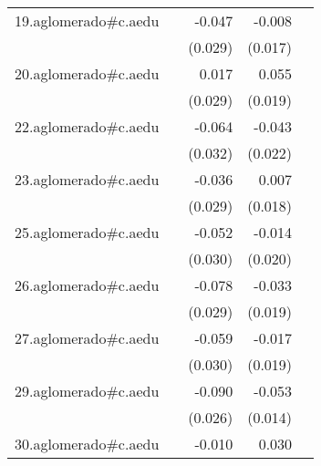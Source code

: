 {\begin{longtable}{l*{4}{D{.}{.}{-1}}}
\addlinespace
19.aglomerado#c.aedu&                     &      -0.047         &      -0.008         &                     \\
            &                     &     (0.029)         &     (0.017)         &                     \\
\addlinespace
20.aglomerado#c.aedu&                     &       0.017         &       0.055\sym{**} &                     \\
            &                     &     (0.029)         &     (0.019)         &                     \\
\addlinespace
22.aglomerado#c.aedu&                     &      -0.064\sym{*}  &      -0.043\sym{*}  &                     \\
            &                     &     (0.032)         &     (0.022)         &                     \\
\addlinespace
23.aglomerado#c.aedu&                     &      -0.036         &       0.007         &                     \\
            &                     &     (0.029)         &     (0.018)         &                     \\
\addlinespace
25.aglomerado#c.aedu&                     &      -0.052         &      -0.014         &                     \\
            &                     &     (0.030)         &     (0.020)         &                     \\
\addlinespace
26.aglomerado#c.aedu&                     &      -0.078\sym{**} &      -0.033         &                     \\
            &                     &     (0.029)         &     (0.019)         &                     \\
\addlinespace
27.aglomerado#c.aedu&                     &      -0.059\sym{*}  &      -0.017         &                     \\
            &                     &     (0.030)         &     (0.019)         &                     \\
\addlinespace
29.aglomerado#c.aedu&                     &      -0.090\sym{***}&      -0.053\sym{***}&                     \\
            &                     &     (0.026)         &     (0.014)         &                     \\
\addlinespace
30.aglomerado#c.aedu&                     &      -0.010         &       0.030         &                     \\

\end{longtable}}
